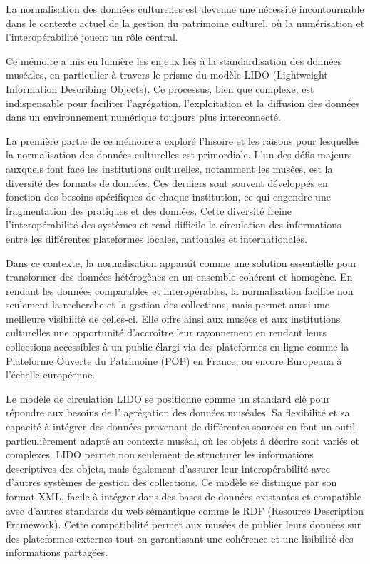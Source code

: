 La normalisation des données culturelles est devenue une nécessité incontournable dans le contexte actuel de la gestion du patrimoine culturel, où la numérisation et l'interopérabilité jouent un rôle central. \newline

Ce mémoire a mis en lumière les enjeux liés à la standardisation des données muséales, en particulier à travers le prisme du modèle LIDO (Lightweight Information Describing Objects). Ce processus, bien que complexe, est indispensable pour faciliter l'agrégation, l'exploitation et la diffusion des données dans un environnement numérique toujours plus interconnecté.\newline

La première partie de ce mémoire a exploré l'hisoire et les raisons pour lesquelles la normalisation des données culturelles est primordiale. L’un des défis majeurs auxquels font face les institutions culturelles, notamment les musées, est la diversité des formats de données. Ces derniers sont souvent développés en fonction des besoins spécifiques de chaque institution, ce qui engendre une fragmentation des pratiques et des données. Cette diversité freine l’interopérabilité des systèmes et rend difficile la circulation des informations entre les différentes plateformes locales, nationales et internationales.\newline

Dans ce contexte, la normalisation apparaît comme une solution essentielle pour transformer des données hétérogènes en un ensemble cohérent et homogène. En rendant les données comparables et interopérables, la normalisation facilite non seulement la recherche et la gestion des collections, mais permet aussi une meilleure visibilité de celles-ci. Elle offre ainsi aux musées et aux institutions culturelles une opportunité d’accroître leur rayonnement en rendant leurs collections accessibles à un public élargi via des plateformes en ligne comme la Plateforme Ouverte du Patrimoine (POP) en France, ou encore Europeana à l’échelle européenne.\newline

Le modèle de circulation LIDO se positionne comme un standard clé pour répondre aux besoins de l' agrégation des données muséales. Sa flexibilité et sa capacité à intégrer des données provenant de différentes sources en font un outil particulièrement adapté au contexte muséal, où les objets à décrire sont variés et complexes. LIDO permet non seulement de structurer les informations descriptives des objets, mais également d’assurer leur interopérabilité avec d’autres systèmes de gestion des collections.
Ce modèle se distingue par son format XML, facile à intégrer dans des bases de données existantes et compatible avec d’autres standards du web sémantique comme le RDF (Resource Description Framework). Cette compatibilité permet aux musées de publier leurs données sur des plateformes externes tout en garantissant une cohérence et une lisibilité des informations partagées. 

